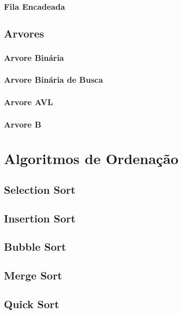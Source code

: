 \documentclass[10pt,a4paper]{article}
\begin{document}
\subsubsection{Fila Encadeada}

\subsection{Arvores}
\subsubsection{Arvore Binária}
\subsubsection{Arvore Binária de Busca}
\subsubsection{Arvore AVL}
\subsubsection{Arvore B}


\section{Algoritmos de Ordenação}
\subsection{Selection Sort}
\subsection{Insertion Sort}
\subsection{Bubble Sort}
\subsection{Merge Sort}
\subsection{Quick Sort}
\end{document}
